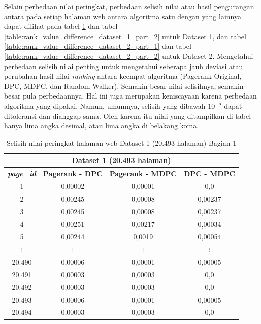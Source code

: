 Selain perbedaan nilai peringkat, perbedaan selisih nilai atau hasil pengurangan antara pada setiap halaman web antara algoritma satu dengan yang lainnya dapat dilihat pada tabel \ref{table:rank_value_difference_dataset_1_part_1} dan tabel \ref{table:rank_value_difference_dataset_1_part_2} untuk Dataset 1, dan tabel \ref{table:rank_value_difference_dataset_2_part_1} dan tabel \ref{table:rank_value_difference_dataset_2_part_2} untuk Dataset 2. Mengetahui perbedaan selisih nilai penting untuk mengetahui seberapa jauh deviasi atau perubahan hasil nilai \textit{ranking} antara keempat algoritma (Pagerank Original, DPC, MDPC, dan Random Walker). Semakin besar nilai selisihnya, semakin besar pula perbedaannya. Hal ini juga merupakan keniscayaan karena perbedaan algoritma yang dipakai. Namun, umumnya, selisih yang dibawah $10^{-5}$ dapat ditoleransi dan dianggap sama. Oleh karena itu nilai yang ditampilkan di tabel hanya lima angka desimal, atau lima angka di belakang koma.
 
\begin{longtable}{|c|c|c|c|}
	\caption{Selisih nilai peringkat halaman web Dataset 1 (20.493 halaman) Bagian 1}
	\label{table:rank_value_difference_dataset_1_part_1} \\
	\hline
	\multicolumn{4}{|c|}{Dataset 1 (20.493 halaman)} \\
	\hline
	\textbf{\textit{page\_id}} & \textbf{Pagerank - DPC} & \textbf{Pagerank - MDPC} & \textbf{DPC - MDPC} \\
	\hline
	1 & 0,00002 & 0,00001 & 0,0  \\
	2 & 0,00245 & 0,00008 & 0,00237  \\
	3 & 0,00245 & 0,00008 & 0,00237  \\
	4 & 0,00251 & 0,00217 & 0,00034  \\
	5 & 0,00244 & 0,0019 & 0,00054  \\
	$\vdots$ & $\vdots$ & $\vdots$ & $\vdots$ \\
	20.490 & 0,00006 & 0,00001 & 0,00005  \\
	20.491 & 0,00003 & 0,00003 & 0,0  \\
	20.492 & 0,00003 & 0,00003 & 0,0  \\
	20.493 & 0,00006 & 0,00001 & 0,00005  \\
	20.494 & 0,00003 & 0,00003 & 0,0  \\
	\hline
\end{longtable}


